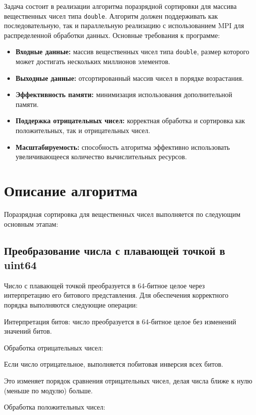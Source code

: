 \documentclass[a4paper,12pt]{article}
\begin{document}
Задача состоит в реализации алгоритма поразрядной сортировки для массива вещественных чисел типа \texttt{double}. Алгоритм должен поддерживать как последовательную, так и параллельную реализацию с использованием MPI для распределенной обработки данных. Основные требования к программе:

\begin{itemize}
    \item \textbf{Входные данные:} массив вещественных чисел типа \texttt{double}, размер которого может достигать нескольких миллионов элементов.
    \item \textbf{Выходные данные:} отсортированный массив чисел в порядке возрастания.
    \item \textbf{Эффективность памяти:} минимизация использования дополнительной памяти.
    \item \textbf{Поддержка отрицательных чисел:} корректная обработка и сортировка как положительных, так и отрицательных чисел.
    \item \textbf{Масштабируемость:} способность алгоритма эффективно использовать увеличивающееся количество вычислительных ресурсов.
\end{itemize}

\section{Описание алгоритма}

Поразрядная сортировка для вещественных чисел выполняется по следующим основным этапам:

\subsection{Преобразование числа с плавающей точкой в uint64}


Число с плавающей точкой преобразуется в 64-битное целое через интерпретацию его битового представления. Для обеспечения корректного порядка выполняются следующие операции:

Интерпретация битов: число преобразуется в 64-битное целое без изменений значений битов.

Обработка отрицательных чисел:

    Если число отрицательное, выполняется побитовая инверсия всех битов.

    Это изменяет порядок сравнения отрицательных чисел, делая числа ближе к нулю (меньше по модулю) больше.

Обработка положительных чисел:
\end{document}
